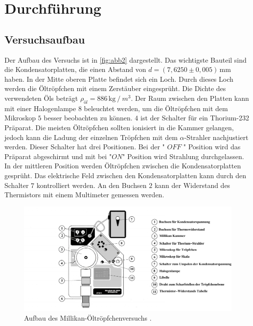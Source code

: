 \section{Durchführung}
\label{sec:Durchführung}

\subsection{Versuchsaufbau}
Der Aufbau des Versuchs ist in \autoref{fig:abb2} dargestellt. Das wichtigste Bauteil sind die Kondensatorplatten, die einen Abstand von $d = (7,6250 \pm 0,005) \, \unit{\milli\meter}$ haben.
In der Mitte oberen Platte befindet sich ein Loch. Durch dieses Loch werden die Öltröpfchen mit einem Zerstäuber eingesprüht.
Die Dichte des verwendeten Öls beträgt $\rho_{öl} = 886 \, \unit{\kilo\gram} \mathbin{/} m^3$. Der Raum zwischen den Platten kann mit einer Halogenlampe $8$ beleuchtet werden, um die Öltröpfchen mit dem Mikroskop $5$ besser beobachten zu können.
$4$ ist der Schalter für ein Thorium-232 Prä­pa­rat. Die meisten Öltröpfchen sollten ionisiert in die Kammer gelangen, jedoch kann die Ladung der einzelnen Tröpfchen mit dem $\alpha$-Strahler nachjustiert werden. Dieser Schalter hat drei Positionen.
Bei der " $OFF$ " Position wird das Prä­pa­rat abgeschirmt und mit bei "$ON$" Position wird Strahlung durchgelassen. In der mittleren Position werden Öltröpfchen zwischen die Kondensatorplatten gesprüht.
Das elektrische Feld zwischen den Kondensatorplatten kann durch den Schalter $7$ kontrolliert werden.
An den Buchsen $2$ kann der Widerstand des Thermistors mit einem Multimeter gemessen werden.


\begin{figure}[H]
    \centering
    \includegraphics[width=1.0\textwidth]{figures/Abb2.pdf}
    \caption{Aufbau des Millikan-Öltröpfchenversuchs \cite{ap12}.}
    \label{fig:abb2}
\end{figure}

